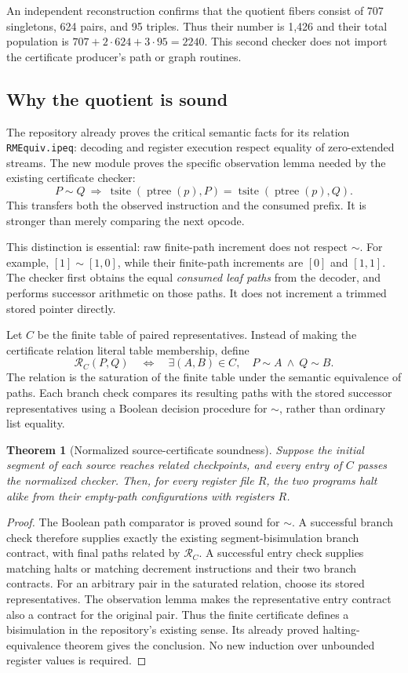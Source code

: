 \documentclass[11pt,letterpaper]{article}
\newtheorem{theorem}{Theorem}[section]
\theoremstyle{definition}\newtheorem{definition}[theorem]{Definition}
\theoremstyle{remark}\newtheorem{remark}[theorem]{Remark}
\begin{document}
An independent reconstruction confirms that the quotient fibers consist of
707 singletons, 624 pairs, and 95 triples. Thus their number is 1,426 and
their total population is $707+2\cdot624+3\cdot95=2240$. This second checker
does not import the certificate producer's path or graph routines.

\subsection{Why the quotient is sound}

The repository already proves the critical semantic facts for its relation
\texttt{RMEquiv.ipeq}: decoding and register execution respect equality of
zero-extended streams. The new module proves the specific observation lemma
needed by the existing certificate checker:
\[
 P\sim Q\ \Longrightarrow\
 \operatorname{tsite}(\operatorname{ptree}(p),P)
 =\operatorname{tsite}(\operatorname{ptree}(p),Q).
\]
This transfers both the observed instruction and the consumed prefix. It
is stronger than merely comparing the next opcode.

This distinction is essential: raw finite-path increment does not respect
$\sim$. For example, $[1]\sim[1,0]$, while their finite-path increments are
$[0]$ and $[1,1]$. The checker first obtains the equal \emph{consumed leaf
paths} from the decoder, and performs successor arithmetic on those paths.
It does not increment a trimmed stored pointer directly.

Let $C$ be the finite table of paired representatives. Instead of making
the certificate relation literal table membership, define
\[
 \mathcal R_C(P,Q)\quad\Longleftrightarrow\quad
 \exists(A,B)\in C,\quad P\sim A\ \land\ Q\sim B.
\]
The relation is the saturation of the finite table under the semantic
equivalence of paths. Each branch check compares its resulting paths with
the stored successor representatives using a Boolean decision procedure
for $\sim$, rather than ordinary list equality.

\begin{theorem}[Normalized source-certificate soundness]
Suppose the initial segment of each source reaches related checkpoints,
and every entry of $C$ passes the normalized checker. Then, for every
register file $R$, the two programs halt alike from their empty-path
configurations with registers $R$.
\end{theorem}

\begin{proof}
The Boolean path comparator is proved sound for $\sim$. A successful
branch check therefore supplies exactly the existing segment-bisimulation
branch contract, with final paths related by $\mathcal R_C$. A successful
entry check supplies matching halts or matching decrement instructions
and their two branch contracts. For an arbitrary pair in the saturated
relation, choose its stored representatives. The observation lemma makes
the representative entry contract also a contract for the original pair.
Thus the finite certificate defines a bisimulation in the repository's
existing sense. Its already proved halting-equivalence theorem gives the
conclusion. No new induction over unbounded register values is required.
\end{proof}
\end{document}

